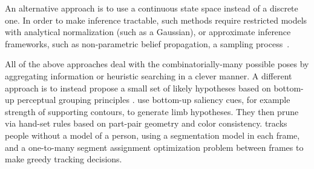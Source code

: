An alternative approach is to use a continuous state space instead of a 
discrete one.  In order to make inference tractable, such methods require 
restricted models with analytical normalization (such as a Gaussian), or 
approximate inference frameworks, such as non-parametric belief propagation, a 
sampling process~\citep{sigal-thesis}.  

All of the above approaches deal with the combinatorially-many possible poses 
by aggregating information or heuristic searching in a clever manner.  A 
different approach is to instead propose a small set of likely hypotheses based 
on bottom-up perceptual grouping principles \citep{mori04,praveen07}.  
\citet{mori04} use bottom-up saliency cues, for example strength of supporting 
contours, to generate limb hypotheses. They then prune via hand-set rules based 
on part-pair geometry and color consistency.  \citet{ren07} tracks people 
without a model of a person, using a segmentation model in each frame, and a 
one-to-many segment assignment optimization problem between frames to make 
greedy tracking decisions.
